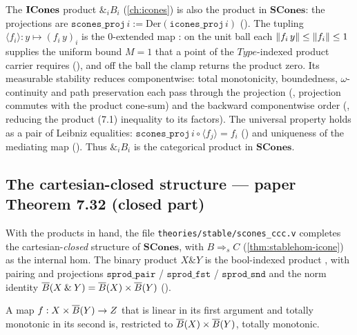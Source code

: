 \begin{theorem}
\label{thm:scones-prod}
\rocqok{}
The $\mathbf{ICones}$ product $\mathbin{\&}_{i} B_i$ (\autoref{ch:icones}) is
also the product in $\mathbf{SCones}$: the projections are
$\texttt{scones\_proj}\,i := \mathrm{Der}(\texttt{icones\_proj}\,i)$
(). The tupling
$\langle f_i \rangle : y \mapsto (f_i\,y)_i$ is the $0$-extended map
: on the unit ball each
$\lVert f_i\,y \rVert \leq \lVert f_i \rVert \leq 1$ supplies the uniform bound
$M = 1$ that a point of the $\mathit{Type}$-indexed product carrier
requires (), and off the
ball the clamp returns the product zero. Its measurable stability
reduces componentwise: total monotonicity, boundedness, $\omega$-
continuity and path preservation each pass through the projection
(, projection commutes
with the product cone-sum) and the backward componentwise order
(, reducing the
product (7.1) inequality to its factors). The universal property holds
as a pair of Leibniz equalities:
$\texttt{scones\_proj}\,i \circ \langle f_j \rangle = f_i$
() and uniqueness of
the mediating map
(). Thus
$\mathbin{\&}_i B_i$ is the categorical product in $\mathbf{SCones}$.
\end{theorem}

\subsection{The cartesian-closed structure --- paper Theorem 7.32 (closed part)}
\label{sec:scones-ccc}
With the products in hand, the file
\texttt{theories/stable/scones\_ccc.v} completes the cartesian-\emph{closed}
structure of $\mathbf{SCones}$, with $B \mathbin{\Rightarrow_s} C$
(\autoref{thm:stablehom-icone}) as the internal hom. The binary product
$X \mathbin{\&} Y$ is the bool-indexed product
, with pairing and projections
$\texttt{sprod\_pair}$ / $\texttt{sprod\_fst}$ / $\texttt{sprod\_snd}$
and the norm identity $\overline{B}(X \mathbin{\&} Y) = \overline{B}(X) \times
\overline{B}(Y)$ ().

\begin{lemma}
\label{lem:lin-totmono}
\rocqok{}
A map $f :  X \times \overline{B}( Y) \to  Z$ that is linear in
its first argument and totally monotonic in its second is, restricted to
$\overline{B}( X) \times \overline{B}( Y)$, totally monotonic.
\end{lemma}

